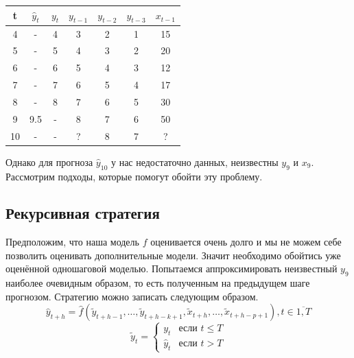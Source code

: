 \documentclass[12pt,fleqn]{article}
\begin{document}
\begin{table}[!ht]
  \centering
  \begin{tabular}{|c|c|c|cccc|}
    \hline
    t              & $\hat{y}_t$ & $y_t$ & $y_{t-1}$ & $y_{t-2}$ & $y_{t-3}$ & $x_{t-1}$ \\ \hline
    4                       & -         & 4              & 3                  & 2         & 1         & 15        \\
    5                       & -         & 5              & 4                  & 3         & 2         & 20        \\
    6                       & -         & 6              & 5                  & 4         & 3         & 12        \\
    7                       & -         & 7              & 6                  & 5         & 4         & 17        \\
    8                       & -         & 8              & 7                  & 6         & 5         & 30        \\ \hline
    9 & 9.5       & -              & 8                  & 7         & 6         & 50        \\
    10 &  -        & -              & ?                  & 8         & 7         & ?        \\ \hline
  \end{tabular}
\end{table}

Однако для прогноза $\hat{y}_{10}$ у нас недостаточно данных, неизвестны $y_9$ и $x_9$.
Рассмотрим подходы, которые помогут обойти эту проблему.

\subsection{Рекурсивная стратегия}

Предположим, что наша модель $f$ оценивается очень долго и мы не можем себе позволить оценивать дополнительные модели.
Значит необходимо обойтись уже оценённой одношаговой моделью.
Попытаемся аппроксимировать неизвестный  $y_9$ наиболее очевидным образом, то есть полученным на предыдущем шаге прогнозом.
Стратегию можно записать следующим образом.
\begin{equation}
  \hat{y}_{t+h} = \hat{f}(\tilde{y}_{t+h-1}, \ldots, \tilde{y}_{t+h-k+1}, \tilde{x}_{t+h}, \ldots, \tilde{x}_{t+h-p+1}), t \in \overline{1, T}
\end{equation}
\begin{equation}
  \tilde{y}_t =
  \begin{cases}
    y_t & \text{если } t \leq T  \\
    \hat{y}_t & \text{если } t > T
  \end{cases}
\end{equation}
\end{document}
